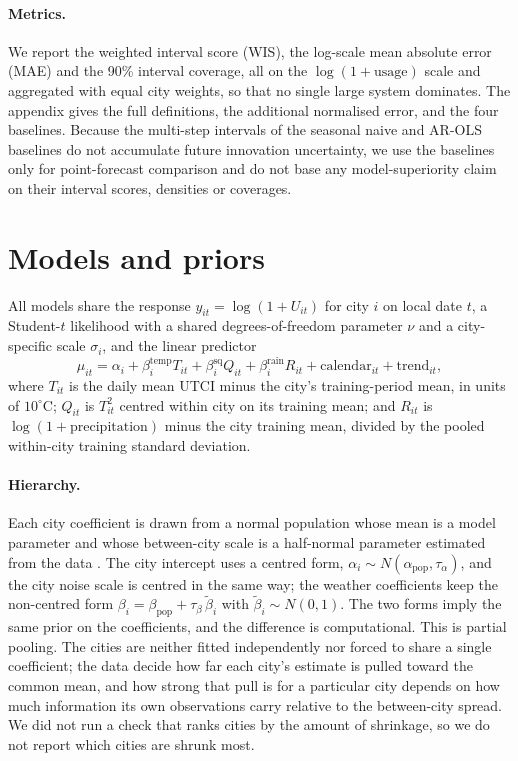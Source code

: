 \documentclass{article}
\begin{document}
\paragraph{Metrics.}
We report the weighted interval score (WIS), the log-scale mean absolute error (MAE) and the 90\%
interval coverage, all on the $\log(1+\text{usage})$ scale and aggregated with equal city weights, so
that no single large system dominates. The appendix gives the full definitions, the additional
normalised error, and the four baselines. Because the multi-step intervals of the seasonal naive and
AR-OLS baselines do not accumulate future innovation uncertainty, we use the baselines only for
point-forecast comparison and do not base any model-superiority claim on their interval scores,
densities or coverages.

\section{Models and priors}

All models share the response $y_{it}=\log(1+U_{it})$ for city $i$ on local date $t$, a Student-$t$
likelihood with a shared degrees-of-freedom parameter $\nu$ and a city-specific scale $\sigma_i$, and
the linear predictor
\begin{equation}
\mu_{it}=\alpha_i+\beta^{\text{temp}}_i T_{it}+\beta^{\text{sq}}_i Q_{it}
+\beta^{\text{rain}}_i R_{it}+\text{calendar}_{it}+\text{trend}_{it},
\end{equation}
where $T_{it}$ is the daily mean UTCI minus the city's training-period mean, in units of
$10^\circ$C; $Q_{it}$ is $T_{it}^2$ centred within city on its training mean; and $R_{it}$ is
$\log(1+\text{precipitation})$ minus the city training mean, divided by the pooled within-city
training standard deviation.

\paragraph{Hierarchy.}
Each city coefficient is drawn from a normal population whose mean is a model parameter and whose
between-city scale is a half-normal parameter estimated from the data \citep{gelman2013bayesian}. The
city intercept uses a centred form, $\alpha_i\sim N(\alpha_{\text{pop}},\tau_\alpha)$, and the city
noise scale is centred in the same way; the weather coefficients keep the non-centred form
$\beta_i=\beta_{\text{pop}}+\tau_\beta\,\tilde\beta_i$ with $\tilde\beta_i\sim N(0,1)$. The two forms
imply the same prior on the coefficients, and the difference is computational. This is partial
pooling. The cities are neither fitted independently nor forced to share a single coefficient; the
data decide how far each city's estimate is pulled toward the common mean, and how strong that pull
is for a particular city depends on how much information its own observations carry relative to the
between-city spread. We did not run a check that ranks cities by the amount of shrinkage, so we do
not report which cities are shrunk most.
\end{document}
